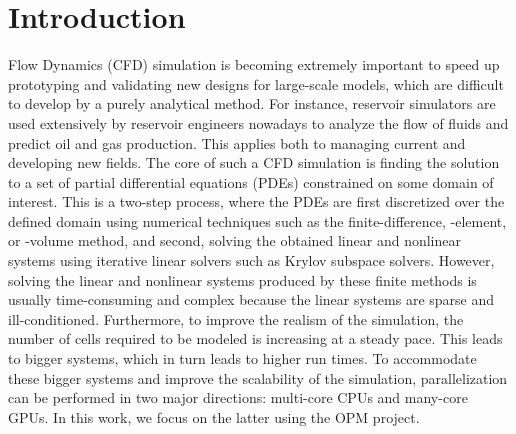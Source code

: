 \section{Introduction}

 Flow Dynamics (CFD) simulation is becoming extremely important to speed up prototyping and validating new designs for large-scale models, which are difficult to develop by a purely analytical method. For instance, reservoir simulators are used extensively by reservoir engineers nowadays to analyze the flow of fluids and predict oil and gas production. This applies both to managing current and developing new fields. The core of such a CFD simulation is finding the solution to a set of partial differential equations (PDEs) constrained on some domain of interest. This is a two-step process, where the PDEs are first discretized over the defined domain using numerical techniques such as the finite-difference, -element, or -volume method, and second, solving the obtained linear and nonlinear systems using iterative linear solvers such as Krylov subspace solvers. However, solving the linear and nonlinear systems produced by these finite methods is usually time-consuming and complex because the linear systems are sparse and ill-conditioned. Furthermore, to improve the realism of the simulation, the number of cells required to be modeled is increasing at a steady pace. This leads to bigger systems, which in turn leads to higher run times. To accommodate these bigger systems and improve the scalability of the simulation, parallelization can be performed in two major directions: multi-core CPUs and many-core GPUs. In this work, we focus on the latter using the OPM project.

